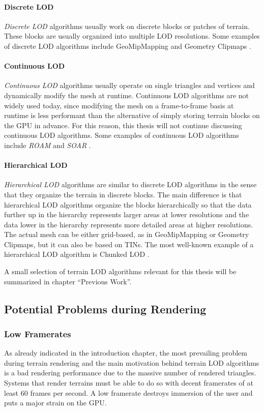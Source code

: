 \paragraph{Discrete LOD} \textit{Discrete LOD} algorithms 
usually work on discrete blocks or patches of terrain. 
These blocks are usually organized into multiple LOD resolutions.
Some examples of discrete LOD algorithms include GeoMipMapping \cite{geomipmapping}
and Geometry Clipmaps \cite{geomclipmaps}.

\paragraph{Continuous LOD} \textit{Continuous LOD} algorithms
usually operate on single triangles and vertices and dynamically 
modify the mesh at runtime. Continuous LOD algorithms are not
widely used today, since modifying the mesh on 
a frame-to-frame basis at runtime is less performant 
than the alternative of simply storing terrain blocks 
on the GPU in advance\cite[p.~368]{3denginedesignforvirtualglobes}. For this reason, this thesis 
will not continue discussing continuous LOD algorithms.
Some examples of continuous LOD algorithms include 
\textit{ROAM} \cite{roam} and \textit{SOAR} \cite{soar}.

\paragraph{Hierarchical LOD} \textit{Hierarchical LOD} algorithms
are similar to discrete LOD algorithms in the sense 
that they organize the terrain in discrete blocks.
The main difference is that hierarchical LOD algorithms organize the blocks 
hierarchically so that the data further up
in the hierarchy represents larger areas at lower resolutions
and the data lower in the hierarchy represents more detailed areas 
at higher resolutions. The actual mesh can be either grid-based, as in 
GeoMipMapping or Geometry Clipmaps, but it can also be 
based on TINs. The most well-known example of a hierarchical LOD algorithm 
is Chunked LOD \cite{chunkedlod}.

A small selection of terrain LOD algorithms relevant for this thesis will 
be summarized in chapter ``Previous Work''.

\subsection{Potential Problems during Rendering}
\subsubsection{Low Framerates}
As already indicated in the introduction chapter,
the most prevailing problem during terrain rendering 
and the main motivation behind terrain LOD algorithms
is a bad rendering performance due to the massive number of
rendered triangles. 
Systems that render terrains must be able to do so 
with decent framerates of at least 60 frames per second.
A low framerate destroys immersion of the user and 
puts a major strain on the GPU.

